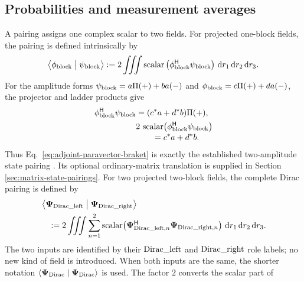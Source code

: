 \documentclass[10pt,letterpaper]{article}
\let\STAamsmathtext\text
\newcommand{\eqtext}[1]{\STAamsmathtext{\normalfont\rmfamily #1}}
\newcommand{\eqfunc}[1]{\operatorname{#1}}
\renewcommand{\text}[1]{\STAamsmathtext{\normalfont\rmfamily #1}}
\newcommand{\pv}[1]{#1}
\newcommand{\bPsi}{\pv{\bm{\Psi}}}
\newcommand{\Hop}{\mathsf H}
\newcommand{\herm}[1]{#1^{\Hop}}
\newcommand{\dd}{\mathrm d}
\begin{document}
\subsection{Probabilities and measurement averages}
A pairing assigns one complex scalar to two fields. For projected one-block
fields, the pairing is defined intrinsically by
\begin{equation}
\left\langle
\pv{\phi}_{\eqtext{block}}
\mathrel{\big|}
\pv{\psi}_{\eqtext{block}}
\right\rangle
:=2\iiint\eqfunc{scalar}\left(
\herm{\pv{\phi}_{\eqtext{block}}}\pv{\psi}_{\eqtext{block}}
\right)\,
\dd r_1\,\dd r_2\,\dd r_3.
\label{eq:adjoint-paravector-braket}
\end{equation}
For the amplitude forms
\(\pv{\psi}_{\eqtext{block}}
=a\pv{\Pi}(+)+b\pv{a}(-)\) and
\(\pv{\phi}_{\eqtext{block}}
=c\pv{\Pi}(+)+d\pv{a}(-)\), the projector and ladder products
give
\begin{equation}
\begin{aligned}
\herm{\pv{\phi}_{\eqtext{block}}}\pv{\psi}_{\eqtext{block}}
&=(c^*a+d^*b)\pv{\Pi}(+),\\
&2\,\eqfunc{scalar}\!\left(
\herm{\pv{\phi}_{\eqtext{block}}}
\pv{\psi}_{\eqtext{block}}
\right)\\[-0.2em]
&\qquad=c^*a+d^*b.
\end{aligned}
\label{eq:projected-amplitude-pairing}
\end{equation}
Thus Eq.\ \eqref{eq:adjoint-paravector-braket} is exactly the established
two-amplitude state pairing \cite{sakurai2017}. Its optional ordinary-matrix
translation is supplied in Section \ref{sec:matrix-state-pairings}.
For two projected two-block fields, the complete Dirac pairing is defined by
\begin{equation}
\begin{aligned}
&\left\langle
\bPsi_{\eqtext{Dirac\_left}}
\mathrel{\big|}
\bPsi_{\eqtext{Dirac\_right}}
\right\rangle\\
&\quad:=2\iiint\sum_{n=1}^{2}
\eqfunc{scalar}\!\left(
 \herm{\bPsi_{\eqtext{Dirac\_left},n}}
 \bPsi_{\eqtext{Dirac\_right},n}
\right)\,\dd r_1\,\dd r_2\,\dd r_3.
\end{aligned}
\label{eq:dirac-pairing}
\end{equation}
The two inputs are identified by their
\(\eqtext{Dirac\_left}\) and \(\eqtext{Dirac\_right}\) role labels; no new
kind of field is introduced. When both inputs are the same, the shorter
notation
\(\langle\bPsi_{\eqtext{Dirac}}\mid\bPsi_{\eqtext{Dirac}}\rangle\)
is used.
The factor \(2\) converts the scalar part of
\end{document}
